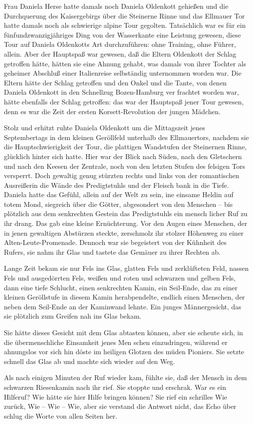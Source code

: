 Frau Daniela Herse hatte damals noch Daniela Oldenkott
gehießen und die Durchquerung des Kaisergebirgs über die
Steinerne Rinne und das Ellmauer Tor hatte damals noch
als schwierige alpine Tour gegolten. Tatsächlich war es für
ein fünfundzwanzigjähriges Ding von der Wasserkante eine
Leistung gewesen, diese Tour auf Daniela Oldenkotts Art
durchzuführen: ohne Training, ohne Führer, allein. Aber der
Hauptspaß war gewesen, daß die Eltern Oldenkott der Schlag
getroffen hätte, hätten sie eine Ahnung gehabt, was damals
von ihrer Tochter als geheimer Abschluß einer Italienreise
selbständig unternommen worden war. Die Eltern hätte der
Schlag getroffen und den Onkel und die Tante, von denen
Daniela Oldenkott in den Schnellzug Bozen-Hamburg ver\-%
frachtet worden war, hätte ebenfalls der Schlag getroffen:
das war der Hauptspaß jener Tour gewesen, denn es war die
Zeit der ersten Korsett-Revolution der jungen Mädchen.

Stolz und erhitzt ruhte Daniela Oldenkott um die Mittagszeit
jenes Septembertags in dem kleinen Geröllfeld unterhalb
des Ellmauertors, nachdem sie die Hauptschwierigkeit der
Tour, die plattigen Wandstufen der Steinernen Rinne,
glücklich hinter sich hatte. Hier war der Blick nach Süden,
nach den Gletschern und nach den Keesen der Zentrale,
noch von den letzten Stufen des felsigen Tors versperrt. Doch
gewaltig genug stürzten rechts und links von der romantischen
Ausreißerin die Wände des Predigtstuhls und der Fleisch\-%
bank in die Tiefe. Daniela hatte das Gefühl, allein auf der
Welt zu sein, ine einsame Heldin auf totem Mond, siegreich
über die Götter, abgesondert von den Menschen -- bis plötzlich
aus dem senkrechten Gestein das Predigtstuhls ein mensch\-%
licher Ruf zu ihr drang. Das gab eine kleine Ernüchterung.
Vor den Augen eines Menschen, der in jenen gewaltigen
Abstürzen steckte, zerschmolz ihr stolzer Höhenweg zu einer
Alten-Leute-Promenade. Dennoch war sie begeistert von der
Kühnheit des Rufers, sie nahm ihr Glas und tastete das
Gemäuer zu ihrer Rechten ab.

Lange Zeit bekam sie nur Fels ins Glas, glatten Fels und
zerklüfteten Feld, nassen Fels und ausgedörrten Fels, weißen
und roten und schwarzen und gelben Fels, dann eine tiefe
Schlucht, einen senkrechten Kamin, ein Seil-Ende, das zu
einer kleinen Geröllstufe in diesem Kamin herabpendelte,
endlich einen Menschen, der neben dem Seil-Ende an der
Kaminwand lehnte. Ein junges Männergesicht, das sie plötzlich
zum Greifen nah ins Glas bekam.

Sie hätte dieses Gesicht mit dem Glas abtasten können, aber
sie scheute sich, in die übermenschliche Einsamkeit jenes Men\-%
schen einzudringen, während er ahnungslos vor sich hin döste
im heiligen Glotzen des müden Pioniers. Sie setzte schnell das
Glas ab und machte sich wieder auf den Weg.

Als nach einigen Minuten der Ruf wieder kam, fühlte sie, daß
der Mensch in dem schwarzen Riesenkamin nach ihr rief. Sie
stoppte und erschrak. War es ein Hilferuf? Wie hätte sie hier
Hilfe bringen können? Sie rief ein schrilles Wie zurück, Wie --
Wie -- Wie, aber sie verstand die Antwort nicht, das Echo über\-%
schlug die Worte von allen Seiten her.
